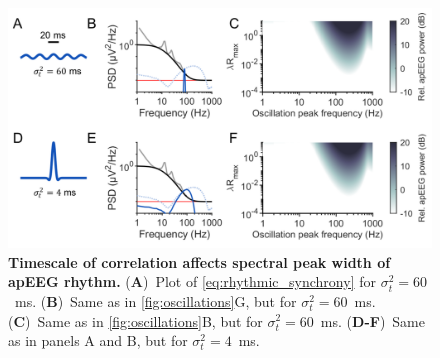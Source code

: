 \begin{figure}[h!]
    \centering
    \includegraphics[width=13.2cm]{Figures/chapter3/figureS6.png}
    \caption[Timescale of correlation affects spectral peak width of apEEG rhythm]{\textbf{Timescale of correlation affects spectral peak width of apEEG rhythm.} (\textbf{A})~Plot of {\ref{eq:rhythmic_synchrony}} for $\sigma_t^2=60$~\unit{\milli\second}. (\textbf{B})~Same as in {\autoref{fig:oscillations}G}, but for $\sigma_t^2=60$~\unit{\milli\second}. (\textbf{C})~Same as in {\autoref{fig:oscillations}B}, but for $\sigma_t^2=60$~\unit{\milli\second}. (\textbf{D-F})~Same as in panels A and B, but for  $\sigma_t^2=4$~\unit{\milli\second}.}
    \label{fig:ap_rhythm_more_sig}
\end{figure}

\clearpage

